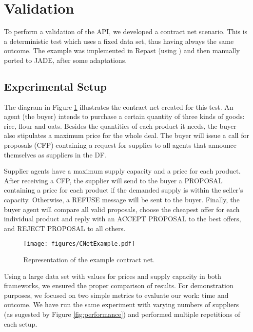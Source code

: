 \section{Validation}
\label{sec:verification}

To perform a validation of the API, we developed a contract net scenario. This is a deterministic test which uses a fixed data set, thus having always the same outcome. The example was implemented in Repast (using \apiname{}) and then manually ported to JADE, after some adaptations.

\subsection{Experimental Setup}

The diagram in Figure \ref{fig:CNetExample} illustrates the contract net created for this test. An agent (the buyer) intends to purchase a certain quantity of three kinds of goods: rice, flour and oats. Besides the quantities of each product it needs, the buyer also stipulates a maximum price for the whole deal. The buyer will issue a call for proposals (CFP) containing a request for supplies to all agents that announce themselves as suppliers in the DF.

Supplier agents have a maximum supply capacity and a price for each product. After receiving a CFP, the supplier will send to the buyer a PROPOSAL containing a price for each product if the demanded supply is within the seller's capacity. Otherwise, a REFUSE message will be sent to the buyer.
Finally, the buyer agent will compare all valid proposals, choose the cheapest offer for each individual product and reply with an ACCEPT PROPOSAL to the best offers, and REJECT PROPOSAL to all others.

\begin{figure}[h]
	\centering
	\texttt{[image: figures/CNetExample.pdf]}
	\caption{
		Representation of the example contract net.
	}
	\label{fig:CNetExample}
\end{figure}

Using a large data set with values for prices and supply capacity in both frameworks, we ensured the proper comparison of results. For demonstration purposes, we focused on two simple metrics to evaluate our work: time and  outcome. We have run the same experiment with varying numbers of suppliers (as sugested by Figure \ref{fig:performance}) and performed multiple repetitions of each setup.

